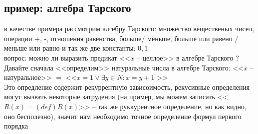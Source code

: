 \subsection{ пример: алгебра Тарского}
в качестве примера рассмотрим алгебру Тарского: множество вещественых чисел, операции +, -, отношения равенства, больше/ меньше, больше или равено / меньше или равно и так же две константы: $0, 1$\\
вопрос: можно ли выразить предикат <<$x$ -- целлое>> в алгебре Тарского ?\\
Давайте сначала <<определим>> натуральные числа в алгебре Тарского: <<$x$ -- натуральное>> $=$ <<$x=1 \lor \exists y \in N : x = y+1$ >>\\
Это опредление содержит рекуррентную зависоимость, рекусивные определения могут вызвать некоторые затрудения (на пример, мы можем записать <<$R(x) =(def) R(x)$>> -- так же руккурентное  определение, но как видно, оно бесполезно), значит нам необходимо точное определение формул первого порядка\\
